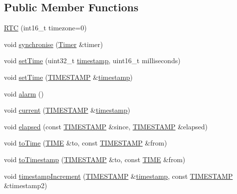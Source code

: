 \subsection*{Public Member Functions}
\begin{DoxyCompactItemize}
\item 
\hyperlink{classmhvlib_1_1_r_t_c_aaa083afe94685139e84e50b792e17d2a}{R\-T\-C} (int16\-\_\-t timezone=0)
\item 
void \hyperlink{classmhvlib_1_1_r_t_c_ae772500a20ba592f0f5b472ed2c4bbd9}{synchronise} (\hyperlink{classmhvlib_1_1_timer}{Timer} \&timer)
\item 
void \hyperlink{classmhvlib_1_1_r_t_c_a4e7ee63690ad06b030b05c8130cc281a}{set\-Time} (uint32\-\_\-t \hyperlink{structmhvlib_1_1timestamp}{timestamp}, uint16\-\_\-t milliseconds)
\item 
void \hyperlink{classmhvlib_1_1_r_t_c_a8316b2ba3f322b8a082180bd77637c71}{set\-Time} (\hyperlink{namespacemhvlib_ae0658d1591e8aabca3a4b259a0c483cd}{T\-I\-M\-E\-S\-T\-A\-M\-P} \&\hyperlink{structmhvlib_1_1timestamp}{timestamp})
\item 
void \hyperlink{classmhvlib_1_1_r_t_c_a10c75b277164f2c4386b0515073672c3}{alarm} ()
\item 
void \hyperlink{classmhvlib_1_1_r_t_c_a699fae329f931809405f492d48cd0684}{current} (\hyperlink{namespacemhvlib_ae0658d1591e8aabca3a4b259a0c483cd}{T\-I\-M\-E\-S\-T\-A\-M\-P} \&\hyperlink{structmhvlib_1_1timestamp}{timestamp})
\item 
void \hyperlink{classmhvlib_1_1_r_t_c_ab34a4ce24b5ecb32b8e8348513b17e57}{elapsed} (const \hyperlink{namespacemhvlib_ae0658d1591e8aabca3a4b259a0c483cd}{T\-I\-M\-E\-S\-T\-A\-M\-P} \&since, \hyperlink{namespacemhvlib_ae0658d1591e8aabca3a4b259a0c483cd}{T\-I\-M\-E\-S\-T\-A\-M\-P} \&elapsed)
\item 
void \hyperlink{classmhvlib_1_1_r_t_c_a32dd522583554aed4c4dc912304344c6}{to\-Time} (\hyperlink{namespacemhvlib_ae8a0c3208996dd45e613708c01cbc83c}{T\-I\-M\-E} \&to, const \hyperlink{namespacemhvlib_ae0658d1591e8aabca3a4b259a0c483cd}{T\-I\-M\-E\-S\-T\-A\-M\-P} \&from)
\item 
void \hyperlink{classmhvlib_1_1_r_t_c_a5f52af1fa5bb398024159b2efda51245}{to\-Timestamp} (\hyperlink{namespacemhvlib_ae0658d1591e8aabca3a4b259a0c483cd}{T\-I\-M\-E\-S\-T\-A\-M\-P} \&to, const \hyperlink{namespacemhvlib_ae8a0c3208996dd45e613708c01cbc83c}{T\-I\-M\-E} \&from)
\item 
void \hyperlink{classmhvlib_1_1_r_t_c_ac966e2a3b173f4b702caf154b91b96cf}{timestamp\-Increment} (\hyperlink{namespacemhvlib_ae0658d1591e8aabca3a4b259a0c483cd}{T\-I\-M\-E\-S\-T\-A\-M\-P} \&\hyperlink{structmhvlib_1_1timestamp}{timestamp}, const \hyperlink{namespacemhvlib_ae0658d1591e8aabca3a4b259a0c483cd}{T\-I\-M\-E\-S\-T\-A\-M\-P} \&timestamp2)

\end{DoxyCompactItemize}
